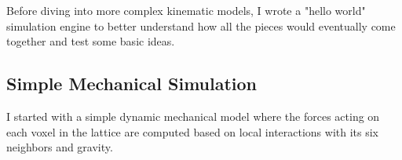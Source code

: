 {Before diving into more complex kinematic models, I wrote a "hello world" simulation engine to better understand how all the pieces would eventually come together and test some basic ideas.

\subsection{Simple Mechanical Simulation}

I started with a simple dynamic mechanical model where the forces acting on each voxel in the lattice are computed based on local interactions with its six neighbors and gravity.



}
